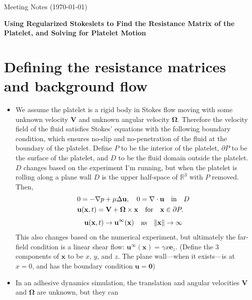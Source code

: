 \documentclass{article}
\newcommand{\tn}{\textnormal}
\newcommand{\vect}[1]{\boldsymbol{\mathbf{#1}}}
\def\R{\mathbb{R}}
\begin{document}
\pagestyle{plain}

\begin{center}
  {\Large Meeting Notes (\today)}
\end{center}

{\Large \textbf{Using Regularized Stokeslets to Find the Resistance
    Matrix of the Platelet, and Solving for Platelet Motion}}

\section{Defining the resistance matrices and background flow}
\label{sec:defin-resist-matr}
{\color{gray}
\begin{itemize}
\item We assume the platelet is a rigid body in Stokes flow moving
  with some unknown velocity $\vect{V}$ and unknown angular
  velocity $\vect{\Omega}$. Therefore the velocity field of the
  fluid satisfies Stokes' equations with the following boundary
  condition, which ensures no-slip and no-penetration of the fluid at
  the boundary of the platelet. Define $P$ to be the interior of the
  platelet, $\partial P$ to be the surface of the platelet, and $D$ to
  be the fluid domain outside the platelet. $D$ changes based on the
  experiment I'm running, but when the platelet is rolling along a
  plane wall $D$ is the upper half-space of $\R^3$ with $P$
  removed. Then,
  \begin{align}
    & 0 = -\nabla p + \mu \Delta \vect{u}, \quad 0 = \nabla \cdot
      \vect{u} \quad \tn{in} \quad D \label{eq:stokes-u} \\
    & \vect{u}(\vect{x}, t) = \vect{V} +
      \vect{\Omega} \times \vect{x} \quad \tn{for} \quad
      \vect{x} \in \partial P. \label{eq:bdy-u}
  \end{align}
  \begin{equation}
    \vect{u}(\vect{x}, t) \rightarrow
    \vect{u}^\infty(\vect{x}) \quad \tn{as} \quad 
    \|\vect{x}\| \rightarrow \infty \label{eq:ff-u}
  \end{equation}
  This also changes based on the numerical experiment, but ultimately
  the far-field condition is a linear shear flow:
  $\vect{u}^\infty(\vect{x}) = \gamma x
  \vect{e}_z$. (Define the 3 components of $\vect{x}$ to be
  $x$, $y$, and $z$. The plane wall---when it exists---is at $x = 0$,
  and has the boundary condition $\vect{u} = \vect{0}$)
\item In an adhesive dynamics simulation, the translation and angular
  velocities $\vect{V}$ and $\vect{\Omega}$ are unknown, but they can

\end{itemize}}
\end{document}
